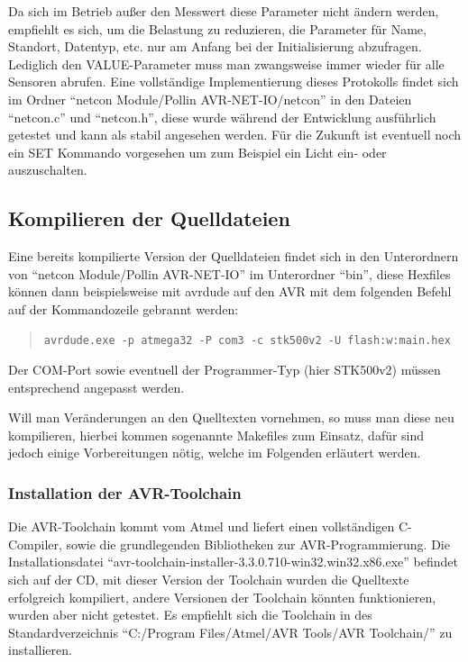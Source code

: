 \documentclass[a4paper,14pt,headsepline]{scrartcl}
\begin{document}
\newpage

Da sich im Betrieb außer den Messwert diese Parameter nicht ändern werden, empfiehlt es sich, um die Belastung zu reduzieren, die Parameter für Name, Standort, Datentyp, etc. nur am Anfang bei der Initialisierung abzufragen. Lediglich den VALUE-Parameter muss man zwangsweise immer wieder für alle Sensoren abrufen. Eine vollständige Implementierung dieses Protokolls findet sich im Ordner "`netcon Module/Pollin AVR-NET-IO/netcon"' in den Dateien "`netcon.c"' und "`netcon.h"', diese wurde während der Entwicklung ausführlich getestet und kann als stabil angesehen werden. Für die Zukunft ist eventuell noch ein SET Kommando vorgesehen um zum Beispiel ein Licht ein- oder auszuschalten.

\newpage

\subsection{Kompilieren der Quelldateien}
Eine bereits kompilierte Version der Quelldateien findet sich in den Unterordnern von "`netcon Module/Pollin AVR-NET-IO"' im Unterordner "`bin"', diese Hexfiles können dann beispielsweise mit avrdude auf den AVR mit dem folgenden Befehl auf der Kommandozeile gebrannt werden:
\begin{quote}
\begin{verbatim}
avrdude.exe -p atmega32 -P com3 -c stk500v2 -U flash:w:main.hex
\end{verbatim}
\end{quote}

Der COM-Port sowie eventuell der Programmer-Typ (hier STK500v2) müssen entsprechend angepasst werden.

Will man Veränderungen an den Quelltexten vornehmen, so muss man diese neu kompilieren, hierbei kommen sogenannte Makefiles zum Einsatz, dafür sind jedoch einige Vorbereitungen nötig, welche im Folgenden erläutert werden.

\subsubsection{Installation der AVR-Toolchain}
Die AVR-Toolchain kommt vom Atmel und liefert einen vollständigen C-Compiler, sowie die grundlegenden Bibliotheken zur AVR-Programmierung. Die Installationsdatei "`avr-toolchain-installer-3.3.0.710-win32.win32.x86.exe"' befindet sich auf der CD, mit dieser Version der Toolchain wurden die Quelltexte erfolgreich kompiliert, andere Versionen der Toolchain könnten funktionieren, wurden aber nicht getestet. Es empfiehlt sich die Toolchain in des Standardverzeichnis "`C:/Program Files/Atmel/AVR Tools/AVR Toolchain/"' zu installieren.
\end{document}
